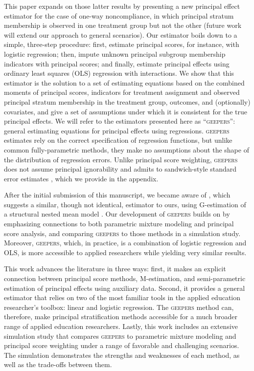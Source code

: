 \documentclass[]{article}
\begin{document}
This paper expands on those latter results by presenting a new principal effect estimator for the case of one-way noncompliance, in which principal stratum membership is observed in one treatment group but not the other (future work will extend our approach to general scenarios). Our estimator boils down to a simple, three-step procedure: first, estimate principal scores, for instance, with logistic regression; then, impute unknown principal subgroup membership indicators with principal scores; and finally, estimate principal effects using ordinary least squares (OLS) regression with interactions. %
We show that this estimator is the solution to a set of estimating equations based on the combined moments of principal scores, indicators for treatment assignment and observed principal stratum membership in the treatment group, outcomes, and (optionally) covariates, and give a set of assumptions under which it is consistent for the true principal effects.
We will refer to the estimators presented here as ``\textsc{geepers}'': general estimating equations for principal effects using regressions.
\textsc{geepers} estimates rely on the correct specification of regression functions, but unlike common fully-parametric methods, they make no assumptions about the shape of the distribution of regression errors.
Unlike principal score weighting, \textsc{geepers} does not assume principal ignorability and admits to sandwich-style standard error estimates \citep{stefanskiBoos}, which we provide in the appendix.

After the initial submission of this manuscript, we became aware of \citet{richardson2023estimating}, which suggests a similar, though not identical, estimator to ours, using G-estimation of a structural nested mean model \citep[e.g.][]{wallace2017r}.
Our development of \textsc{geepers} builds on \citet{richardson2023estimating} by emphasizing connections to both parametric mixture modeling and principal score analysis, and comparing \textsc{geepers} to those methods in a simulation study.
Moreover, \textsc{geepers}, which, in practice, is a combination of logistic regression and OLS, is more accessible to applied researchers while yielding very similar results.
 
This work advances the literature in three ways: first, it makes an explicit connection between principal score methods, M-estimation, and semi-parametric estimation of principal effects using auxiliary data. Second, it provides a general estimator that relies on two of the most familiar tools in the applied education researcher's toolbox: linear and logistic regression. The \textsc{geepers} method can, therefore, make principal stratification methods accessible for a much broader range of applied education researchers. Lastly, this work includes an extensive simulation study that compares \textsc{geepers} to parametric mixture modeling and principal score weighting under a range of favorable and challenging scenarios. The simulation demonstrates the strengths and weaknesses of each method, as well as the trade-offs between them.
\end{document}
